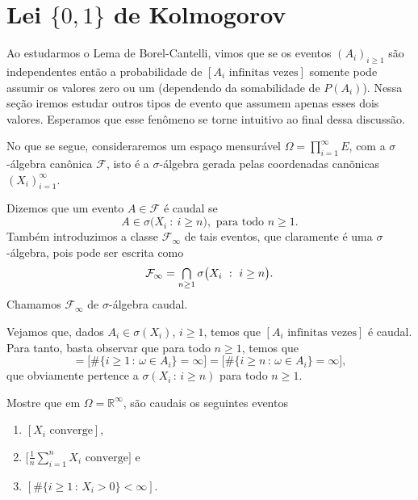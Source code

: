 \section{Lei \texorpdfstring{$\{0, 1\}$}{\{0,1\}} de Kolmogorov}

Ao estudarmos o Lema de Borel-Cantelli, vimos que se os eventos $(A_i)_{i \geq 1}$ são independentes então a probabilidade de $[A_i \text{ infinitas vezes}]$ somente pode assumir os valores zero ou um (dependendo da somabilidade de $P(A_i)$).
Nessa seção iremos estudar outros tipos de evento que assumem apenas esses dois valores.
Esperamos que esse fenômeno se torne intuitivo ao final dessa discussão.

No que se segue, consideraremos um espaço mensurável $\Omega = \prod_{i=1}^\infty E$, com a $\sigma$-álgebra canônica $\mathcal{F}$,
isto é a $\sigma$-álgebra gerada pelas coordenadas canõnicas $(X_i)_{i=1}^\infty$.
\begin{definition}
  Dizemos que um evento $A \in \mathcal{F}$ é caudal se
  \begin{equation}
    A \in \sigma\big( X_i \ : \ i \geq n\big), \text{ para todo $n \geq 1$}.
  \end{equation}
  Também introduzimos a classe $\mathcal{F}_\infty$ de tais eventos, que claramente é uma $\sigma$-álgebra, pois pode ser escrita como
  \begin{equation}
    \mathcal{F}_\infty = \operatorname*{{\textstyle \bigcap}}_{n \geq 1} \sigma\big( X_i \ : \ i \geq n\big).
  \end{equation}
  Chamamos $\mathcal{F}_\infty$ de $\sigma$-álgebra caudal. 
\end{definition}

Vejamos que, dados $A_i \in \sigma(X_i)$, $i \geq 1$, temos que $[A_i \text{ infinitas vezes}]$ é caudal.
Para tanto, basta observar que para todo $n \geq 1$, temos que
\begin{equation*}
  [A_i \text{ infinitas vezes}] = \big[\#\{i \geq 1 \, : \, \omega \in A_i\} = \infty\big] = \big[\#\{i \geq n \, : \, \omega \in A_i\} = \infty\big],
\end{equation*}
que obviamente pertence a $\sigma(X_i\, : \, i \geq n)$ para todo $n \geq 1$.

\begin{exercise}
  Mostre que em $\Omega = \mathbb{R}^{\infty}$, são caudais os seguintes eventos
  \begin{enumerate}[\quad a)]
  \item $[X_i \text{ converge}]$,
  \item $\big[\tfrac{1}{n} \sum_{i=1}^n X_i \text{ converge}\big]$ e
  \item $[\#\{i \geq 1\, : \, X_i > 0\} < \infty]$.
  \end{enumerate}
\end{exercise}

